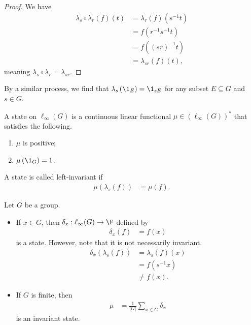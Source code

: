 \documentclass[10pt]{mypackage}
\begin{document}
\begin{proof}
  We have
  \begin{align*}
    \lambda_s\circ \lambda_r\left(f\right)\left(t\right) &= \lambda_r\left(f\right)\left(s^{-1}t\right)\\
                                                         &= f\left(r^{-1}s^{-1}t\right)\\
                                                         &= f\left(\left(sr\right)^{-1}t\right)\\
                                                         &= \lambda_{sr}\left(f\right)\left(t\right),
  \end{align*}
  meaning $\lambda_s\circ \lambda_r = \lambda_{sr}$.
\end{proof}
\begin{remark}
  By a similar process, we find that $\lambda_{s}\left(\1_{E}\right) = \1_{sE}$ for any subset $E\subseteq G$ and $s\in G$.
\end{remark}
\begin{definition}
  A state on $\ell_{\infty}\left(G\right)$ is a continuous linear functional $\mu\in \left(\ell_{\infty}\left(G\right)\right)^{\ast}$ that satisfies the following.
  \begin{enumerate}[(1)]
    \item $\mu$ is positive;
    \item $\mu\left(\1_{G}\right) = 1$.
  \end{enumerate}
  A state is called left-invariant if
  \begin{align*}
    \mu\left(\lambda_{s}\left(f\right)\right) &= \mu\left(f\right).
  \end{align*}
  
\end{definition}
\begin{example}
  Let $G$ be a group.
  \begin{itemize}
    \item If $x\in G$, then $\delta_{x}:\ell_{\infty}(G) \rightarrow \F$ defined by
      \begin{align*}
        \delta_{x}\left(f\right) &= f(x)
      \end{align*}
      is a state. However, note that it is not necessarily invariant.
      \begin{align*}
        \delta_{x}\left(\lambda_s\left(f\right)\right) &= \lambda_{s}\left(f\right)\left(x\right)\\
                                                       &= f\left(s^{-1}x\right)\\
                                                       &\neq f(x).
      \end{align*}
    \item If $G$ is finite, then
      \begin{align*}
        \mu &= \frac{1}{\left\vert G \right\vert} \sum_{x\in G}\delta_{x}
      \end{align*}
      is an invariant state.
  \end{itemize}
\end{example}
\end{document}
